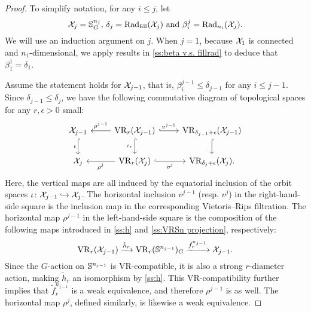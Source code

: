 \begin{proof}
    To simplify notation, for any $i \leq j$, let
    \[
        \mathcal{X}_j = \mathbb{S}^{n_j}_G, \,\delta_j = \mathrm{Rad}_{\mathrm{fill}}(\mathcal{X}_j) \text{ and }\beta_i^j = \mathrm{Rad}_{n_i}(\mathcal{X}_j).
    \]
	We will use an induction argument on $j$.
	When $j = 1$, because $\mathcal{X}_1$ is connected and $n_1$-dimensional, we apply results in \cref{ss:beta v.s. fillrad} to deduce that $\beta_1^1 = \delta_1$.

	Assume the statement holds for $\mathcal{X}_{j-1}$, that is, $\beta_i^{j-1} \leq \delta_{j-1}$ for any $i \leq j-1$.
	Since $\delta_{j-1} \leq \delta_j$, we have the following commutative diagram of topological spaces for any $r,\epsilon>0$ small:
    \begin{equation}\label{d:fundamental_bars_diagram}
        \begin{tikzcd}
            \cX_{j-1}
            \ar[d, hook,"{\iota}" left]
            &
            \VR_r(\cX_{j-1})
            \ar[d, hook,"\iota_r" left]
            \ar[l, "\rho^{j-1}" above]
            \ar[r, hook, "v^{j-1}"]
            &
            \VR_{\delta_{j-1}+\epsilon}(\cX_{j-1})
            \ar[d, hook]
            \\
            \cX_j
            &
            \VR_r(\cX_j)
            \ar[l, "\rho^j" below]
            \ar[r, hook, "v^j" below]
            &
            \VR_{\delta_j+\epsilon}(\cX_j).
        \end{tikzcd}
    \end{equation}
    Here, the vertical maps are all induced by the equatorial inclusion of the orbit spaces $\iota \colon \mathcal{X}_{j-1} \hookrightarrow \mathcal{X}_j$.
    The horizontal inclusion $v^{j-1}$ (resp. $v^j$) in the right-hand-side square is the inclusion map in the corresponding Vietoris--Rips filtration.
    The horizontal map $\rho^{j-1}$ in the left-hand-side square is the composition of the following maps introduced in \cref{ss:h} and \cref{ss:VRSn projection}, respectively:
    \[\mathrm{VR}_r(\mathcal{X}_{j-1}) \xrightarrow{\tilde{h}_r}\mathrm{VR}_r(\mathbb{S}^{n_{j-1}})_G \xrightarrow{\tilde{f}_r^{n_{j-1}}} \mathcal{X}_{j-1}.\]
     Since the \( G \)-action on \( \mathbb{S}^{n_{j-1}} \) is VR-compatible, it is also a strong \( r \)-diameter action, making \( \tilde{h}_r \) an isomorphism by \cref{ss:h}.
    This VR-compatibility further implies that \( \tilde{f}_r^{n_{j-1}} \) is a weak equivalence, and therefore \( \rho^{j-1} \) is as well.
    The horizontal map \( \rho^j \), defined similarly, is likewise a weak equivalence.


\end{proof}
